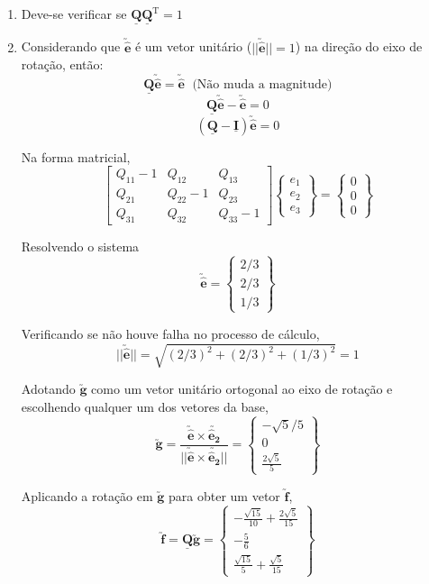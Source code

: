 	\begin{enumerate}
		\item Deve-se verificar se $\underline{\mathbf{Q}}\underline{\mathbf{Q}}^{\text{T}}=1$
		\item Considerando que $\utilde{\mathbf{\hat{e}}}$ é um vetor unitário ($||\utilde{\mathbf{\hat{e}}}||=1$) na direção do eixo de rotação, então:
		\[\underline{\mathbf{Q}}\utilde{\mathbf{\hat{e}}}=\utilde{\mathbf{\hat{e}}}\;\text{ (Não muda a magnitude)}\]
		\[\underline{\mathbf{Q}}\utilde{\mathbf{\hat{e}}}-\utilde{\mathbf{\hat{e}}}=0\]
		\[(\underline{\mathbf{Q}}-\underline{\mathbf{I}})\utilde{\mathbf{\hat{e}}}=0\]
		
		Na forma matricial,
		\[
			\begin{bmatrix}
				Q_{11}-1 & Q_{12} & Q_{13} \\
				Q_{21} & Q_{22}-1 & Q_{23} \\
				Q_{31} & Q_{32} & Q_{33}-1
			\end{bmatrix}
			\begin{Bmatrix}
				e_1 \\ e_2 \\ e_3
			\end{Bmatrix}
			=
			\begin{Bmatrix}
				0 \\ 0 \\ 0
			\end{Bmatrix}
		\]
		
		Resolvendo o sistema
		\[
			\utilde{\mathbf{\hat{e}}}
			=
			\begin{Bmatrix}
				2/3 \\ 2/3 \\ 1/3
			\end{Bmatrix}
		\]
		
		Verificando se não houve falha no processo de cálculo,
		\[||\utilde{\mathbf{\hat{e}}}||=\sqrt{(2/3)^2+(2/3)^2+(1/3)^2}=1\]
		
		Adotando $\utilde{\mathbf{g}}$ como um vetor unitário ortogonal ao eixo de rotação e escolhendo qualquer um dos vetores da base,
		\[
			\utilde{\mathbf{g}}
			=
			\frac{\utilde{\mathbf{\hat{e}}}\times\utilde{\mathbf{\hat{e}_2}}}{||\utilde{\mathbf{\hat{e}}}\times\utilde{\mathbf{\hat{e}_2}}||}
			=
			\begin{Bmatrix}
				-\sqrt{5}/5 \\ 0 \\ \frac{2\sqrt{5}}{5}
			\end{Bmatrix}
		\]
		
		Aplicando a rotação em $\utilde{\mathbf{g}}$ para obter um vetor $\utilde{\mathbf{f}}$,
		\[
			\utilde{\mathbf{f}}
			=
			\underline{\mathbf{Q}}\utilde{\mathbf{g}}
			=
			\begin{Bmatrix}
				-\frac{\sqrt{15}}{10}+\frac{2\sqrt{5}}{15} \\ -\frac{5}{6} \\ \frac{\sqrt{15}}{5}+\frac{\sqrt{5}}{15}
			\end{Bmatrix}
		\]
		

\end{enumerate}
